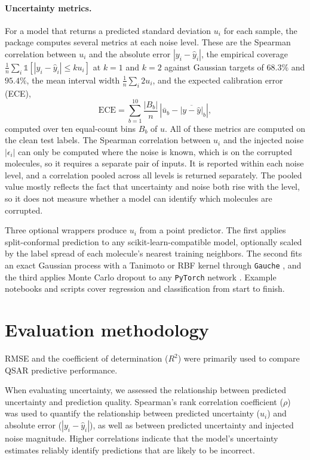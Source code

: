 \paragraph{Uncertainty metrics.} For a model that returns a predicted standard deviation
$u_i$ for each sample, the package computes several metrics at each noise level. These are the Spearman correlation between $u_i$ and the
absolute error $|y_i - \hat{y}_i|$, the empirical coverage $\frac{1}{n}\sum_i \mathbb{1}\left[|y_i -
\hat{y}_i| \le k u_i\right]$ at $k = 1$ and $k = 2$ against Gaussian targets of $68.3\%$ and
$95.4\%$, the mean interval width $\frac{1}{n}\sum_i 2u_i$, and the expected calibration error (ECE),
\begin{equation}
\mathrm{ECE} = \sum_{b=1}^{10} \frac{|B_b|}{n}\,\left|\bar{u}_b - \overline{|y - \hat{y}|}_b\right|,
\label{eq:ece}
\end{equation}
computed over ten equal-count bins $B_b$ of $u$. All of these metrics are computed on the clean test labels. The Spearman
correlation between $u_i$ and the injected noise $|\epsilon_i|$ can only be computed where the noise
is known, which is on the corrupted molecules, so it requires a separate pair of inputs. It is reported
within each noise level, and a correlation pooled across all levels is returned separately. The pooled value
mostly reflects the fact that uncertainty and noise both rise with the level, so it
does not measure whether a model can identify which molecules are corrupted.

Three optional wrappers produce $u_i$ from a point predictor. The first applies split-conformal prediction to any
scikit-learn-compatible model, optionally scaled by the label spread of each molecule's nearest
training neighbors. The second fits an exact Gaussian process with a Tanimoto or RBF kernel through \texttt{Gauche}
\citep{gauche}, and the third applies Monte Carlo dropout to any \texttt{PyTorch} network \citep{gal2016}. Example
notebooks and scripts cover regression and classification from start to finish.


\section{Evaluation methodology}


RMSE and the coefficient of determination ($R^2$) were primarily used to compare QSAR predictive performance.


When evaluating uncertainty, we assessed the relationship between predicted uncertainty and prediction quality. Spearman's rank correlation coefficient ($\rho$) was used to quantify the relationship between predicted uncertainty ($u_i$) and absolute error ($|y_i - \hat{y}_i|$), as well as between predicted uncertainty and injected noise magnitude. Higher correlations indicate that the model's uncertainty estimates reliably identify predictions that are likely to be incorrect.

